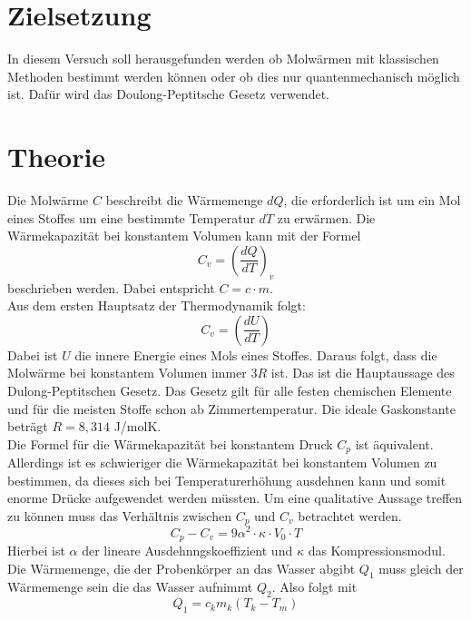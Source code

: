 
  \section{Zielsetzung}
  In diesem Versuch soll herausgefunden werden ob Molwärmen mit klassischen Methoden
  bestimmt werden können oder ob dies nur quantenmechanisch möglich ist.
  Dafür wird das Doulong-Peptitsche Gesetz verwendet.

  \section{Theorie}
Die Molwärme $C$ beschreibt die Wärmemenge $dQ$, die erforderlich ist um ein Mol eines Stoffes um eine bestimmte
Temperatur $dT$ zu erwärmen.
Die Wärmekapazität bei konstantem Volumen kann mit der Formel
\begin{equation}
  C_v = \left(\frac{dQ}{dT}\right)_v
\end{equation}
beschrieben werden. Dabei entspricht $C = c\cdot m$.\\
Aus dem ersten Hauptsatz der Thermodynamik folgt:
\begin{equation*}
  C_v = \left(\frac{dU}{dT}\right)
\end{equation*}
Dabei ist $U$ die innere Energie eines Mols eines Stoffes.
Daraus folgt, dass die Molwärme bei konstantem Volumen immer $3R$ ist.
Das ist die Hauptaussage des Dulong-Peptitschen Gesetz.
Das Gesetz gilt für alle festen chemischen Elemente und für die meisten Stoffe schon ab
 Zimmertemperatur. Die ideale Gaskonstante beträgt $R = 8,314$ J/molK.\\
Die Formel für die Wärmekapazität bei konstantem Druck $C_p$ ist äquivalent.
Allerdings ist es schwieriger die Wärmekapazität bei konstantem Volumen  zu bestimmen,
da dieses sich bei Temperaturerhöhung ausdehnen kann und somit enorme Drücke aufgewendet werden müssten.
Um eine qualitative Aussage treffen zu können muss das Verhältnis zwischen $C_p$ und $C_v$ betrachtet werden.
\begin{equation}
  C_p - C_v = 9\alpha ^2\cdot \kappa\cdot V_0\cdot T
    \label{eqn:cv}
\end{equation}
Hierbei ist $\alpha$ der lineare Ausdehnngskoeffizient und $\kappa$ das Kompressionsmodul.\\
Die Wärmemenge, die der Probenkörper an das Wasser abgibt $Q_1$
muss gleich der Wärmemenge sein die das Wasser aufnimmt $Q_2$.
Also folgt mit
\begin{equation*}
  Q_1 = c_km_k(T_k -T_m)
\end{equation*}
